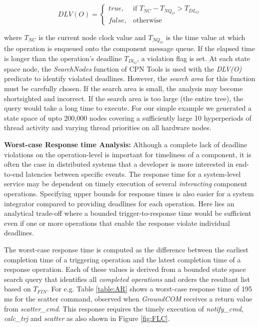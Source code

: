 \vspace{-0.1in}
\begin{equation}
\label{eq:DLV}
DLV(O)= 
\begin{cases}
true,& \text{if } T_{NC} - T_{NQ_{O}} > T_{DL_{O}}\\
false,              & \text{otherwise}
\end{cases}
\end{equation}

where $T_{NC}$ is the current node clock value and $T_{NQ_{O}}$ is the time value at which the operation is enqueued onto the component message queue. If the elapsed time is longer than the operation's deadline $T_{Dl_{O}}$, a violation flag is set. At each state space node, the \emph{SearchNodes} function of CPN Tools is used with the \emph{DLV(O)} predicate to identify violated deadlines. However, the \emph{search area} for this function must be carefully chosen. If the search area is small, the analysis may become shortsighted and incorrect. If the search area is too large (the entire tree), the query would take a long time to execute. For our simple example we generated a state space of upto 200,000 nodes covering a sufficiently large 10 hyperperiods of thread activity and varying thread priorities on all hardware nodes.

\textbf{Worst-case Response time Analysis:}
Although a complete lack of deadline violations on the operation-level is important for timeliness of a component, it is often the case in distributed systems that a developer is more interested in end-to-end latencies between specific events. The response time for a system-level service may be dependent on timely execution of several \emph{interacting} component operations. Specifying upper bounds for response times is also easier for a system integrator compared to providing deadlines for each operation. Here lies an analytical trade-off where a bounded trigger-to-response time would be sufficient even if one or more operations that enable the response violate individual deadlines. 

The worst-case response time is computed as the difference between the earliest completion time of a triggering operation and the latest completion time of a  response  operation. Each of these values is derived from a bounded state space search query that identifies all \emph{completed operations} and orders the resultant list based on $T_{FIN}$. For e.g. Table \ref{table:AR} shows a worst-case response time of 195 ms for the scatter command, observed when \emph{GroundCOM} receives a return value from \emph{scatter\_cmd}. This response requires the timely execution of \emph{notify\_cmd}, \emph{calc\_trj} and \emph{scatter} as also shown in Figure \ref{fig:FLC}. 

